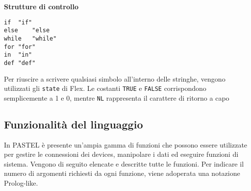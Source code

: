\documentclass[10pt]{article}
\begin{document}
\textbf{Strutture di controllo}
\begin{lstlisting}[breaklines=true, postbreak=\mbox{{$\hookrightarrow$}\space}]
if	"if"
else	"else
while	"while"
for	"for"
in	"in"
def	"def"
\end{lstlisting}

Per riuscire a scrivere qualsiasi simbolo all'interno delle stringhe, vengono utilizzati gli \texttt{state} di Flex. Le costanti \texttt{TRUE} e \texttt{FALSE} corrispondono semplicemente a 1 e 0, mentre \texttt{NL} rappresenta il carattere di ritorno a capo

\subsection{Funzionalità del linguaggio}\label{subsection:fun}
In PASTEL è presente un'ampia gamma di funzioni che possono essere utilizzate per gestire le connessioni dei devices, manipolare i dati ed eseguire funzioni di sistema. Vengono di seguito elencate e descritte tutte le funzioni. Per indicare il numero di argomenti richiesti da ogni funzione, viene adoperata una notazione Prolog-like.
\end{document}
